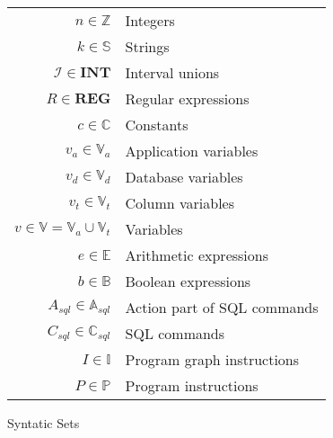 \begin{figure}[htb!]
    \center
    \begin{tabular}{r p{ }}
        $n \in \mathbb{Z}$                                  & Integers                                                  \\
        $k \in \mathbb{S}$                                  & Strings                                                   \\
        $\mathscr{I} \in \mathbf{INT}$                      & Interval unions                                           \\
        $R \in \mathbf{REG}$                                & Regular expressions                                       \\
        $c \in \mathbb{C}$                                  & Constants                                                 \\
        $v_a \in \mathbb{V}_a$                              & Application variables                                     \\
        $v_d \in \mathbb{V}_d$                              & Database variables                                        \\
        $v_t \in \mathbb{V}_t$                              & Column variables                                          \\
        $v \in \mathbb{V} = \mathbb{V}_a \cup \mathbb{V}_t$ & Variables                                                 \\
        $e \in \mathbb{E}$                                  & Arithmetic expressions                                    \\
        $b \in \mathbb{B}$                                  & Boolean expressions                                       \\
        $A_{sql} \in \mathbb{A}_{sql}$                      & Action part of SQL commands                               \\
        $C_{sql} \in \mathbb{C}_{sql}$                      & SQL commands                                              \\
        $I \in \mathbb{I}$                                  & Program graph instructions                                \\
        $P \in \mathbb{P}$                                  & Program instructions                                      \\
    \end{tabular}
    \caption{Syntatic Sets}
    \label{fig:syntatic-sets}
\end{figure}

